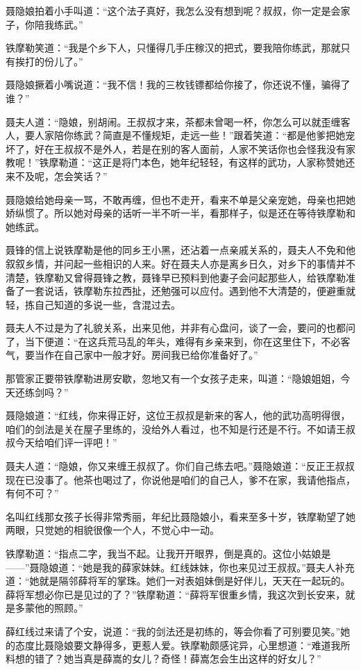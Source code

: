 \documentclass[12pt,oneside]{book}
\begin{document}
聂隐娘拍着小手叫道：``这个法子真好，我怎么没有想到呢？叔叔，你一定是会家子，你陪我练武。''

铁摩勒笑道：``我是个乡下人，只懂得几手庄稼汉的把式，要我陪你练武，那就只有挨打的份儿了。''

聂隐娘撅着小嘴说道：``我不信！我的三枚钱镖都给你接了，你还说不懂，骗得了谁？''

聂夫人道：``隐娘，别胡闹。王叔叔才来，茶都未曾喝一杯，你怎么可以就歪缠客人，要人家陪你练武？简直是不懂规矩，走远一些！''跟着笑道：``都是他爹把她宠坏了，好在王叔叔不是外人，若是在别的客人面前，人家不笑话你也会怪我没有家教呢！''铁摩勒道：``这正是将门本色，她年纪轻轻，有这样的武功，人家称赞她还来不及呢，怎会笑话？''

聂隐娘给她母亲一骂，不敢再缠，但也不走开，看来不单是父亲宠她，母亲也把她娇纵惯了。所以她对母亲的话听一半不听一半，看那样子，似是还在等待铁摩勒和她练武。

聂锋的信上说铁摩勒是他的同乡王小黑，还沾着一点亲戚关系的，聂夫人不免和他叙叙乡情，并问起一些相识的人来。好在聂夫人亦是离乡日久，对乡下的事情并不清楚，铁摩勒又曾得聂锋之教，聂锋早已预料到他妻子会问起那些人，给铁摩勒准备了一套说话，铁摩勒东拉西扯，还勉强可以应付。遇到他不大清楚的，便避重就轻，拣自己知道的多说一些，含混过去。

聂夫人不过是为了礼貌关系，出来见他，并非有心盘问，谈了一会，要问的也都问了，当下便道：``在这兵荒马乱的年头，难得有乡亲来到，你在这里住下，不必客气，要当作在自己家中一般才好。房间我已给你准备好了。''

那管家正要带铁摩勒进房安歇，忽地又有一个女孩子走来，叫道：``隐娘姐姐，今天还练剑吗？''

聂隐娘道：``红线，你来得正好，这位王叔叔是新来的客人，他的武功高明得很，咱们的剑法是关在屋子里练的，没给外人看过，也不知是行还是不行。不如请王叔叔今天给咱们评一评吧！''

聂夫人道：``隐娘，你又来缠王叔叔了。你们自己练去吧。''聂隐娘道：``反正王叔叔现在已没事了。他茶也喝过了，你说他是咱们的自己人，爹不在家，我请他指点，有何不可？''

名叫红线那女孩子长得非常秀丽，年纪比聂隐娘小，看来至多十岁，铁摩勒望了她两眼，只觉她的相貌很像一个人，不觉心中一动。

铁摩勒道：``指点二字，我当不起。让我开开眼界，倒是真的。这位小姑娘是------''聂隐娘道：``她是我的薛家妹妹。红线妹妹，你也来见过王叔叔。''聂夫人补充道：``她就是隔邻薛将军的掌珠。她们一对表姐妹倒是好伴儿，天天在一起玩的。薛将军想必你已是见过的了？''铁摩勒道：``薛将军很重乡情，我这次到长安来，就是多蒙他的照顾。''

薛红线过来请了个安，说道：``我的剑法还是初练的，等会你看了可别要见笑。''她的态度比聂隐娘要文静得多，更惹人爱。铁摩勒颇感诧异，心里想道：``难道我所料想的错了？她当真是薛嵩的女儿？奇怪！薛嵩怎会生出这样的好女儿？''
\end{document}
